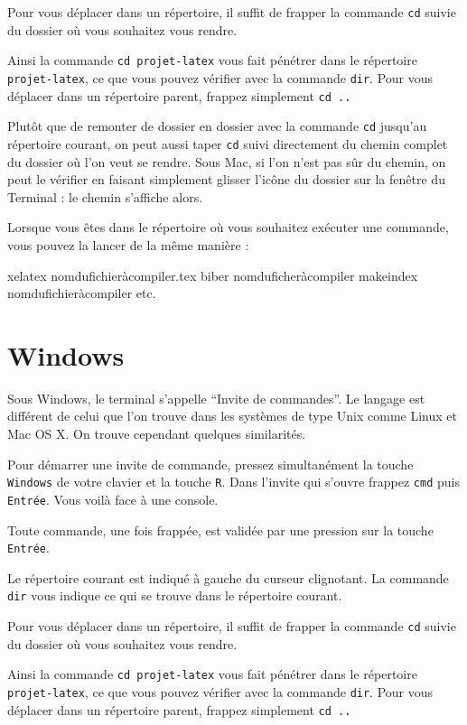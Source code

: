 Pour vous déplacer dans un répertoire, il suffit de frapper la commande
\verb|cd| suivie du dossier où vous souhaitez vous rendre.

Ainsi la commande \verb|cd projet-latex| vous fait pénétrer dans le
répertoire \verb|projet-latex|, ce que vous pouvez vérifier avec la
commande \verb|dir|. Pour vous déplacer dans un répertoire parent, frappez
simplement \verb|cd ..|

Plutôt que de remonter de dossier en dossier avec la commande \verb|cd| jusqu'au répertoire courant, on peut aussi  taper  \verb|cd| suivi directement du chemin complet du dossier où l'on veut se rendre. Sous Mac, si l'on n'est pas sûr du chemin, on peut le vérifier en faisant simplement glisser l'icône du dossier sur la fenêtre du Terminal : le chemin s'affiche alors.

Lorsque vous êtes dans le répertoire où vous souhaitez exécuter une
commande, vous pouvez la lancer de la même manière :

\begin{bashcode}
xelatex nomdufichieràcompiler.tex
biber nomduficheràcompiler
makeindex nomdufichieràcompiler
etc.
\end{bashcode}

\section{Windows}
Sous Windows, le terminal s'appelle \enquote{Invite de commandes}. Le langage
est différent de celui que l'on trouve dans les systèmes de type Unix comme
Linux et Mac OS X. On trouve cependant quelques similarités.

Pour démarrer une invite de commande, pressez simultanément la touche \verb|Windows| de votre
clavier et la touche \verb|R|. Dans l'invite qui s'ouvre frappez \verb|cmd| puis
\verb|Entrée|. Vous voilà face à une console.

Toute commande, une fois frappée, est validée par une pression sur la touche \verb|Entrée|.

Le répertoire courant est indiqué à gauche du curseur clignotant.
La commande \verb|dir| vous indique ce qui se trouve dans le répertoire
courant.

Pour vous déplacer dans un répertoire, il suffit de frapper la commande
\verb|cd| suivie du dossier où vous souhaitez vous rendre.

Ainsi la commande \verb|cd projet-latex| vous fait pénétrer dans le
répertoire \verb|projet-latex|, ce que vous pouvez vérifier avec la
commande \verb|dir|. Pour vous déplacer dans un répertoire parent, frappez
simplement \verb|cd ..|

